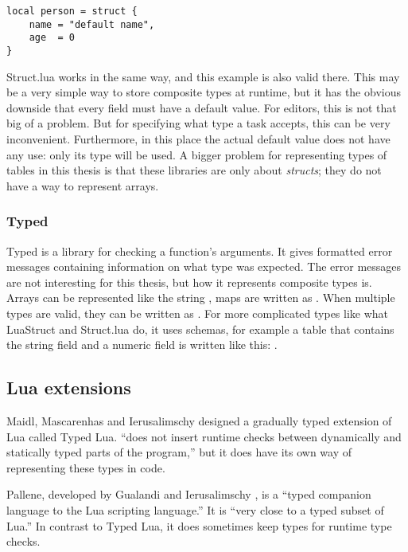 \medskip
\begin{verbatim}
local person = struct {
    name = "default name",
    age  = 0
}
\end{verbatim}

Struct.lua works in the same way, and this example is also valid there. This may be a very simple way to store composite types at runtime, but it has the obvious downside that every field must have a default value. For editors, this is not that big of a problem. But for specifying what type a task accepts, this can be very inconvenient. Furthermore, in this place the actual default value does not have any use: only its type will be used. A bigger problem for representing types of tables in this thesis is that these libraries are only about \textit{structs}; they do not have a way to represent arrays.

\subsubsection{Typed}
Typed is a library for checking a function's arguments. It gives formatted error messages containing information on what type was expected. The error messages are not interesting for this thesis, but how it represents composite types is. Arrays can be represented like the string , maps are written as . When multiple types are valid, they can be written as . For more complicated types like what LuaStruct and Struct.lua do, it uses schemas, for example a table that contains the string field  and a numeric field  is written like this: .

\subsection{Lua extensions}
Maidl, Mascarenhas and Ierusalimschy \cite{maidl2014typed} designed a gradually typed extension of Lua called Typed Lua. ``does not insert runtime checks between dynamically and statically typed parts of the program,'' but it does have its own way of representing these types in code.

Pallene, developed by Gualandi and Ierusalimschy \cite{gualandi2020pallene}, is a ``typed companion language to the Lua scripting language.'' It is ``very close to a typed subset of Lua.'' In contrast to Typed Lua, it does sometimes keep types for runtime type checks.

